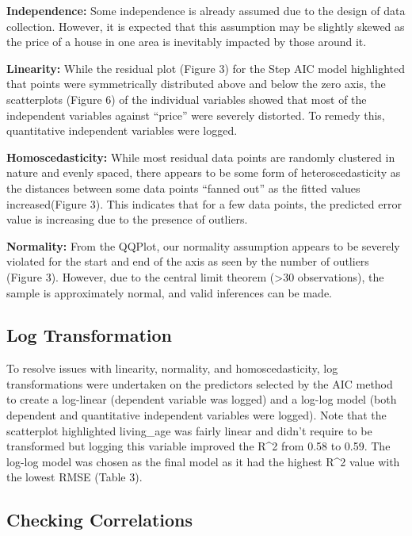 \documentclass[letterpaper,8pt,twocolumn,twoside,]{pinp}
\begin{document}
\textbf{Independence:} Some independence is already assumed due to the
design of data collection. However, it is expected that this assumption
may be slightly skewed as the price of a house in one area is inevitably
impacted by those around it.

\textbf{Linearity:} While the residual plot (Figure 3) for the Step AIC
model highlighted that points were symmetrically distributed above and
below the zero axis, the scatterplots (Figure 6) of the individual
variables showed that most of the independent variables against
``price'' were severely distorted. To remedy this, quantitative
independent variables were logged.

\textbf{Homoscedasticity:} While most residual data points are randomly
clustered in nature and evenly spaced, there appears to be some form of
heteroscedasticity as the distances between some data points ``fanned
out'' as the fitted values increased(Figure 3). This indicates that for
a few data points, the predicted error value is increasing due to the
presence of outliers.

\textbf{Normality:} From the QQPlot, our normality assumption appears to
be severely violated for the start and end of the axis as seen by the
number of outliers (Figure 3). However, due to the central limit theorem
(\textgreater30 observations), the sample is approximately normal, and
valid inferences can be made.

\hypertarget{log-transformation}{%
\subsection{Log Transformation}\label{log-transformation}}

To resolve issues with linearity, normality, and homoscedasticity, log
transformations were undertaken on the predictors selected by the AIC
method to create a log-linear (dependent variable was logged) and a
log-log model (both dependent and quantitative independent variables
were logged). Note that the scatterplot highlighted living\_age was
fairly linear and didn't require to be transformed but logging this
variable improved the R\^{}2 from 0.58 to 0.59. The log-log model was
chosen as the final model as it had the highest R\^{}2 value with the
lowest RMSE (Table 3).

\hypertarget{checking-correlations}{%
\subsection{Checking Correlations}\label{checking-correlations}}
\end{document}
